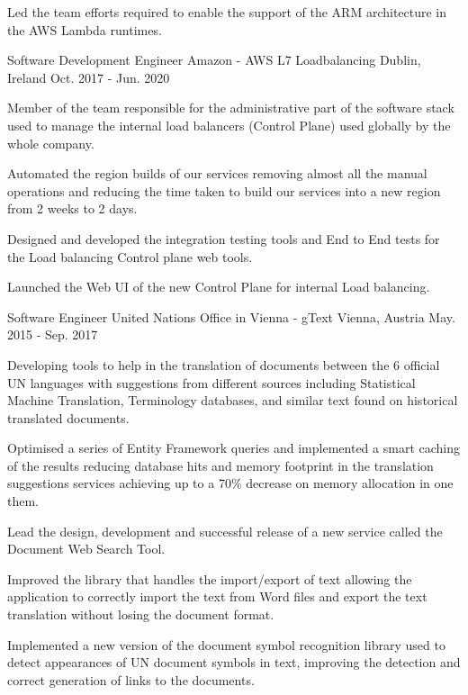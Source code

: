 \begin{cventries}
{\begin{cvitems}
        \item {Led the team efforts required to enable the support of the ARM architecture in the AWS Lambda runtimes.}
      \end{cvitems}
    }
  \cventry
    {Software Development Engineer} %
    {Amazon - AWS L7 Loadbalancing} %
    {Dublin, Ireland} %
    {Oct. 2017 - Jun. 2020} %
    {}
    {
      \begin{cvitems} %
        \item {Member of the team responsible for the administrative part of the software stack used to manage the internal load balancers (Control Plane) used globally by the whole company.}
        \item {Automated the region builds of our services removing almost all the manual operations and reducing the time taken to build our services into a new region from 2 weeks to 2 days.}
        \item {Designed and developed the integration testing tools and End to End tests for the Load balancing Control plane web tools.}
        \item {Launched the Web UI of the new Control Plane for internal Load balancing.}
      \end{cvitems}
    }

  \cventry
    {Software Engineer} %
    {United Nations Office in Vienna - gText} %
    {Vienna, Austria} %
    {May. 2015 - Sep. 2017} %
    {}
    {
      \begin{cvitems} %
        \item {Developing tools to help in the translation of documents between the 6 official UN languages with suggestions from different sources including Statistical Machine Translation, Terminology databases, and similar text found on historical translated documents.}
        \item {Optimised a series of Entity Framework queries and implemented a smart caching of the results reducing database hits and memory footprint in the translation suggestions services achieving up to a 70\% decrease on memory allocation in one them.}
        \item {Lead the design, development and successful release of a new service called the Document Web Search Tool.}
        \item {Improved the library that handles the import/export of text allowing the application to correctly import the text from Word files and export the text translation without losing the document format.}
        \item {Implemented a new version of the document symbol recognition library used to detect appearances of UN document symbols in text, improving the detection and correct generation of links to the documents.}
      \end{cvitems}
    }


\end{cventries}

